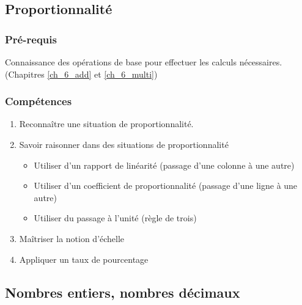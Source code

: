 \subsection{Proportionnalité}\label{ch_6_proba}

\subsubsection*{Pré-requis}

Connaissance des opérations de base pour effectuer les calculs nécessaires. (Chapitres \ref{ch_6_add} et \ref{ch_6_multi})


\subsubsection*{Compétences}

\begin{enumerate}
	
	\item Reconnaître une situation de proportionnalité.
	\item Savoir raisonner dans des situations de proportionnalité
	\begin{itemize}
		\item Utiliser d'un rapport de linéarité (passage d'une colonne à une autre)
		\item Utiliser d'un coefficient de proportionnalité (passage d'une ligne à une autre) 
		\item Utiliser du passage à l'unité (règle de trois)		
	\end{itemize}
	\item Maîtriser la notion d'échelle
	\item Appliquer un taux de pourcentage
\end{enumerate}


\subsection{Nombres entiers, nombres décimaux}\label{ch_6_nombres}



